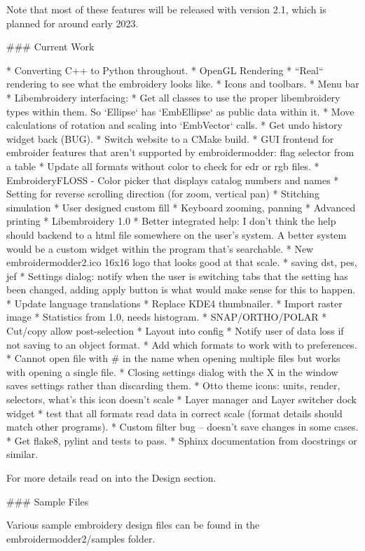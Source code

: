 Note that most of these features will be released with version 2.1, which is planned for around early 2023.

### Current Work

* Converting C++ to Python throughout.
* OpenGL Rendering
  * ``Real`` rendering to see what the embroidery looks like.
  * Icons and toolbars.
  * Menu bar
* Libembroidery interfacing:
  * Get all classes to use the proper libembroidery types within them. So `Ellipse` has `EmbEllipse` as public data within it.
* Move calculations of rotation and scaling into `EmbVector` calls.
* Get undo history widget back (BUG).
* Switch website to a CMake build.
* GUI frontend for embroider features that aren't supported by embroidermodder: flag selector from a table
* Update all formats without color to check for edr or rgb files.
* EmbroideryFLOSS - Color picker that displays catalog numbers and names
* Setting for reverse scrolling direction (for zoom, vertical pan)
* Stitching simulation
* User designed custom fill
* Keyboard zooming, panning
* Advanced printing
* Libembroidery 1.0
* Better integrated help: I don't think the help should backend to a html file somewhere on the user's system. A better system would be a custom widget within the program that's searchable.
* New embroidermodder2.ico 16x16 logo that looks good at that scale.
* saving dst, pes, jef
* Settings dialog: notify when the user is switching tabs that the setting has been changed, adding apply button is what would make sense for this to happen.
* Update language translations
* Replace KDE4 thumbnailer.
* Import raster image
* Statistics from 1.0, needs histogram.
* SNAP/ORTHO/POLAR
* Cut/copy allow post-selection
* Layout into config
* Notify user of data loss if not saving to an object format.
* Add which formats to work with to preferences.
* Cannot open file with \# in the name when opening multiple files but works with opening a single file.
* Closing settings dialog with the X in the window saves settings rather than discarding them.
* Otto theme icons: units, render, selectors, what's this icon doesn't scale
* Layer manager and Layer switcher dock widget
* test that all formats read data in correct scale (format details should match other programs).
* Custom filter bug -- doesn't save changes in some cases.
* Get flake8, pylint and tests to pass.
* Sphinx documentation from docstrings or similar.

For more details read on into the Design section.

### Sample Files

Various sample embroidery design files can be found in the embroidermodder2/samples folder.


